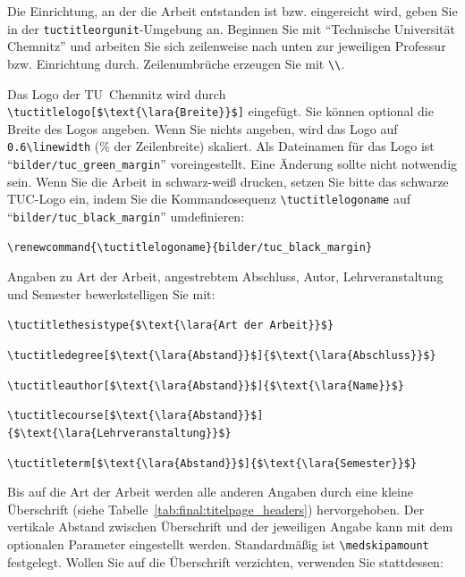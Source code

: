 Die Einrichtung, an der die Arbeit entstanden ist bzw. eingereicht wird, geben
Sie in der \texttt{tuctitleorgunit}-Umgebung an. Beginnen Sie mit "`Technische
Universität Chemnitz"' und arbeiten Sie sich zeilenweise nach unten zur
jeweiligen Professur bzw. Einrichtung durch. Zeilenumbrüche erzeugen Sie mit
\verb+\\+.

Das Logo der TU~Chemnitz wird durch \lstinline[language={[LaTeX]{TeX}},mathescape]+\tuctitlelogo[$\text{\lara{Breite}}$]+
eingefügt. Sie können optional die Breite des Logos angeben. Wenn Sie nichts
angeben, wird das Logo auf \verb+0.6\linewidth+ (\unit[60]{\%} der Zeilenbreite)
skaliert. Als Dateinamen für das Logo ist "`\texttt{bilder/tuc\_green\_margin}"'
voreingestellt. Eine Änderung sollte nicht notwendig sein. Wenn Sie die Arbeit
in schwarz-weiß drucken, setzen Sie bitte das schwarze TUC-Logo ein, indem Sie
die Kommandosequenz \verb+\tuctitlelogoname+ auf
"`\texttt{bilder/tuc\_black\_margin}"' umdefinieren:
%
\begin{lstlisting}[language={[LaTeX]{TeX}},style=block]
\renewcommand{\tuctitlelogoname}{bilder/tuc_black_margin}
\end{lstlisting}

Angaben zu Art der Arbeit, angestrebtem Abschluss, Autor, Lehrveranstaltung und
Semester bewerkstelligen Sie mit:

\begin{compactitem}
\item \lstinline[language={[LaTeX]{TeX}},mathescape]+\tuctitlethesistype{$\text{\lara{Art der Arbeit}}$}+
\item \lstinline[language={[LaTeX]{TeX}},mathescape]+\tuctitledegree[$\text{\lara{Abstand}}$]{$\text{\lara{Abschluss}}$}+
\item \lstinline[language={[LaTeX]{TeX}},mathescape]+\tuctitleauthor[$\text{\lara{Abstand}}$]{$\text{\lara{Name}}$}+
\item \lstinline[language={[LaTeX]{TeX}},mathescape]+\tuctitlecourse[$\text{\lara{Abstand}}$]{$\text{\lara{Lehrveranstaltung}}$}+
\item \lstinline[language={[LaTeX]{TeX}},mathescape]+\tuctitleterm[$\text{\lara{Abstand}}$]{$\text{\lara{Semester}}$}+
\end{compactitem}

Bis auf die Art der Arbeit werden alle anderen Angaben durch eine kleine
Überschrift (siehe Tabelle~\ref{tab:final:titelpage_headers}) hervorgehoben.
Der vertikale Abstand zwischen Überschrift und der jeweiligen Angabe kann mit
dem optionalen Parameter eingestellt werden. Standardmäßig ist
\verb+\medskipamount+ festgelegt. Wollen Sie auf die Überschrift verzichten,
verwenden Sie stattdessen:

